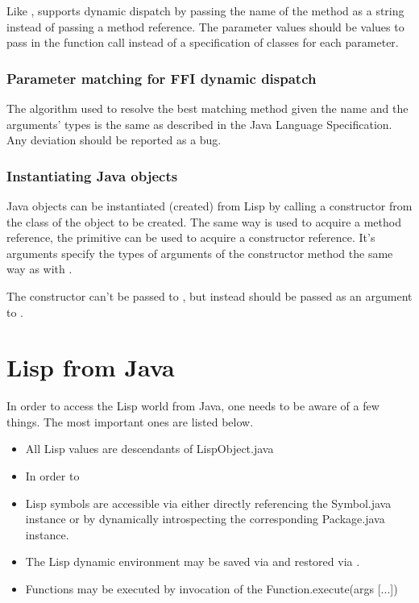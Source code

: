 \documentclass[10pt]{book}
\begin{document}
Like ,  supports dynamic dispatch by
passing the name of the method as a string instead of passing a method reference.
The parameter values should be values to pass in the function call instead of
a specification of classes for each parameter.

\subsubsection{Parameter matching for FFI dynamic dispatch}

The algorithm used to resolve the best matching method given the name
and the arguments' types is the same as described in the Java Language
Specification. Any deviation should be reported as a bug.


\subsubsection{Instantiating Java objects}

Java objects can be instantiated (created) from Lisp by calling
a constructor from the class of the object to be created. The same way
 is used to acquire a method reference, the
 primitive can be used to acquire a constructor
reference. It's arguments specify the types of arguments of the constructor
method the same way as with .

The constructor can't be passed to , but instead should
be passed as an argument to .

\section{Lisp from Java}

In order to access the Lisp world from Java, one needs to be aware
of a few things. The most important ones are listed below.

\begin{itemize}
\item All Lisp values are descendants of LispObject.java
\item In order to 
\item Lisp symbols are accessible via either directly referencing the
  Symbol.java instance or by dynamically introspecting the
  corresponding Package.java instance.
\item The Lisp dynamic environment may be saved via
   and restored via
  .
\item Functions may be executed by invocation of the
  Function.execute(args [...]) 
\end{itemize}
\end{document}
